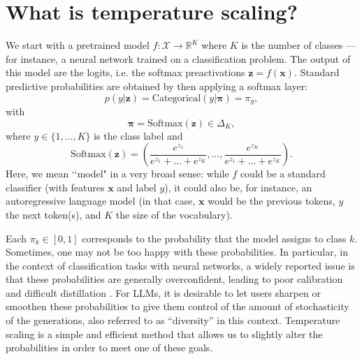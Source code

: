 \documentclass[10pt,dvipsnames]{article}
\newcommand{\bx}{\mathbf{x}}%
\newcommand{\bz}{\mathbf{z}}%
\newcommand{\bpi}{\boldsymbol{\pi}}%
\theoremstyle{plain}
\theoremstyle{definition}
\theoremstyle{remark}
\begin{document}
\section{What is temperature scaling?}
\label{sec:whatisTS}
We start with a pretrained model $f: \mathcal{X} \rightarrow \mathbb{R}^K$ where $K$ is the number of classes --- for instance, a neural network trained on a classification problem. The output of this model are the logits, i.e. the softmax preactivations $\bz = f(\bx)$. Standard predictive probabilities are obtained by then applying a softmax layer:
\begin{equation}
	p(y | \bz) = \text{Categorical}(y |\bpi) = \pi_y, 
\end{equation}
with
\begin{equation}
\boldsymbol{\pi} = \text{Softmax} (\bz ) \in \Delta_{K},
\end{equation}
where $y \in \{1,\ldots ,K\}$ is the class label and
\begin{equation}
	\text{Softmax} (\bz ) = \left( \frac{e^{z_1}}{e^{z_1}+ \ldots + e^{z_K}}, \ldots, \frac{e^{z_K}}{e^{z_1}+ \ldots + e^{z_K}} \right).
\end{equation}
Here, we mean ‘‘model" in a very broad sense: while $f$ could be a standard classifier (with features $\bx$ and label $y$), it could also be, for instance, an autoregressive language model (in that case, $\bx$ would be the previous tokens, $y$ the next token(s), and $K$ the size of the vocabulary).



Each $\pi_k\in[0,1]$ corresponds to the probability that the model assigns to class $k$. Sometimes, one may not be too happy with these probabilities. In particular, in the context of classification tasks with neural networks, a widely reported issue is that these probabilities are generally overconfident, leading to poor calibration \citep{guo2017calibration, minderer2021revisiting} and difficult distillation \citep{hinton2015distilling}. 
For LLMs, it is desirable to let users sharpen or smoothen these probabilities to give them control of the amount of stochasticity of the generations, also referred to as ``diversity'' in this context. Temperature scaling is a simple and efficient method that allows us to slightly alter the probabilities in order to meet one of these goals. 
\end{document}
